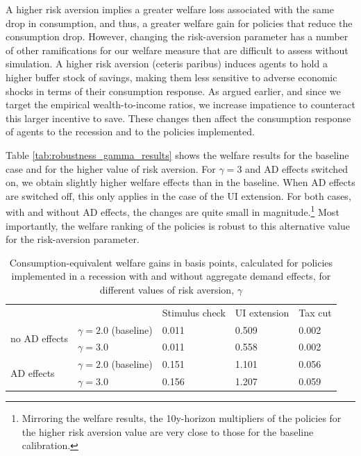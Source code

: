 \documentclass[\econtexRoot/HAFiscal]{subfiles}
\begin{document}
A higher risk aversion implies a greater welfare loss associated with the same drop in consumption, and thus, a greater welfare gain for policies that reduce the consumption drop. However, changing the risk-aversion parameter has a number of other ramifications for our welfare measure that are difficult to assess without simulation. A higher risk aversion (ceteris paribus) induces agents to hold a higher buffer stock of savings, making them less sensitive to adverse economic shocks in terms of their consumption response. As argued earlier, and since we target the empirical wealth-to-income ratios, we increase impatience to counteract this larger incentive to save. These changes then affect the consumption response of agents to the recession and to the policies implemented. 

Table \ref{tab:robustness_gamma_results} shows the welfare results for the baseline case and for the higher value of risk aversion. For $\gamma=3$ and AD effects switched on, we obtain slightly higher welfare effects than in the baseline. When AD effects are switched off, this only applies in the case of the UI extension. For both cases, with and without AD effects, the changes are quite small in magnitude.\footnote{Mirroring the welfare results, the 10y-horizon multipliers of the policies for the higher risk aversion value are very close to those for the baseline calibration.} Most importantly, the welfare ranking of the policies is robust to this alternative value for the risk-aversion parameter.

\begin{table}[]
  \begin{center}
    \begin{tabular}{@{}lllll@{}}
      \toprule
      &                    & Stimulus check & UI extension & Tax cut \\ \cmidrule(l){1-5} 
      \multirow{2}{*}{no AD effects}
      & $\gamma = 2.0$ (baseline) & 0.011          & 0.509        & 0.002   \\
      & $\gamma = 3.0$ 			& 0.011          & 0.558        & 0.002   \\ \cmidrule(l){1-5} 
      \multirow{2}{*}{AD effects}
      & $\gamma = 2.0$ (baseline) & 0.151          & 1.101        & 0.056   \\
      & $\gamma = 3.0$    		& 0.156          & 1.207        & 0.059   \\ \cmidrule(l){1-5} 
    \end{tabular}
    \caption{Consumption-equivalent welfare gains in basis points, calculated for policies implemented in a recession with and without aggregate demand effects, for different values of risk aversion, $\gamma$}
    \notinsubfile{\label{tab:robustness_gamma_results}}
  \end{center}
\end{table}
\end{document}
